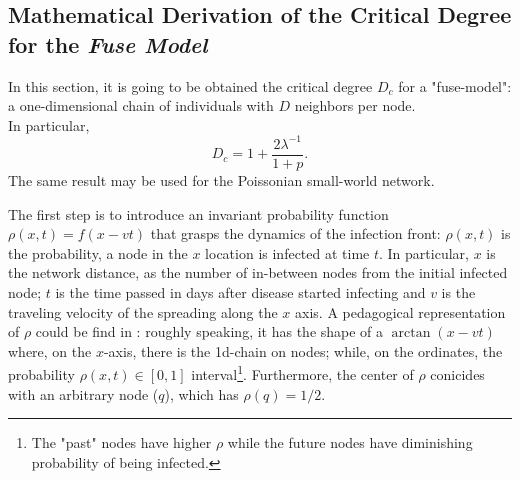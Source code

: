 \documentclass[a4paper,10pt,twoside]{book} %
\theoremstyle{definition}
\begin{document}
\subsection*{Mathematical Derivation of the Critical Degree for the \textit{Fuse Model} }

In this section, it is going to be obtained the critical degree $ D_c$  \cite{Thurner::NetBasedExpl} for a "fuse-model": a one-dimensional chain of individuals with $D$ neighbors per node.
\\In particular, 
\begin{equation}
	D_c = 1 + \frac{2 \lambda^{-1}}{1+p}.
	\label{eq:prelim_Dc_fusemodel}
\end{equation}
The same result may be used for the Poissonian small-world network.

The first step is to introduce an invariant probability function $\rho(x,t) = f(x-vt)$ that grasps the dynamics of the infection front: $\rho(x,t)$ is the probability, a node in the $x$ location is infected at time $t$.
In particular, $x$ is the network distance, as the number of in-between nodes from the initial infected node; $t$ is the time passed in days after disease started infecting and $v$ is the traveling velocity of the spreading along the $x$ axis.
A pedagogical representation of $\rho$ could be find in \cite{Thurner::Appendix_NetBasedExpl}: roughly speaking, it has the shape of a $\arctan(x-vt)$ where, on the $x$-axis, there is the 1d-chain on  nodes; while, on the ordinates, the probability $ \rho(x,t)\in [0,1]$ interval\footnote{The "past" nodes have higher $\rho$ while the future nodes have diminishing probability of being infected.}. Furthermore, the center of $ \rho$ conicides with an arbitrary node ($q$), which has $\rho(q) = 1/2$.
\end{document}
